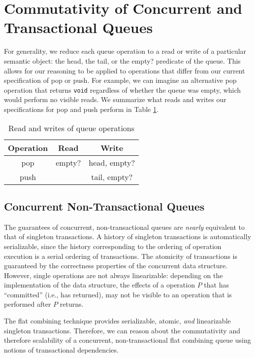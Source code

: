 
\section{Commutativity of Concurrent and Transactional Queues}

For generality, we reduce each queue operation to a read or write of a particular semantic object: the head, the tail, or the empty? predicate of the queue. This allows for our reasoning to be applied to operations that differ from our current specification of pop or push. For example, we can imagine an alternative pop operation that returns \texttt{void} regardless of whether the queue was empty, which would perform no visible reads. We summarize what reads and writes our specifications for pop and push perform in Table \ref{table:qrw}.
\begin{table}[h!]
\centering
\begin{tabular}{c||c|c}
    Operation & Read & Write\\
    \hline
    \hline
    pop & empty? & head, empty?\\
    push & & tail, empty?\\
\end{tabular}
    \caption{Read and writes of queue operations}
    \label{table:qrw}
\end{table}

\subsection{Concurrent Non-Transactional Queues}

The guarantees of concurrent, non-transactional queues are \emph{nearly} equivalent to that of singleton transactions. A history of singleton transactions is automatically serializable, since the history corresponding to the ordering of operation execution is a serial ordering of transactions. The atomicity of transactions is guaranteed by the correctness properties of the concurrent data structure. However, single operations are not always linearizable: depending on the implementation of the data structure, the effects of a operation $P$ that has ``committed'' (i.e., has returned), may not be visible to an operation that is performed after $P$ returns.

The flat combining technique provides serializable, atomic, \emph{and} linearizable singleton transactions\cite{flatcombining}. Therefore, we can reason about the commutativity and therefore scalability of a concurrent, non-transactional flat combining queue using notions of transactional dependencies.

